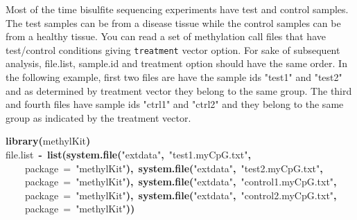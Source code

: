 \documentclass{article}
\makeatletter
\newcommand{\hlfunctioncall}[1]{\textcolor[rgb]{.5,0,.33}{\textbf{#1}}}%
\newcommand{\hlstring}[1]{\textcolor[rgb]{.6,.6,1}{#1}}%
\newcommand{\hlkeyword}[1]{\textbf{#1}}%
\newcommand{\hlargument}[1]{\textcolor[rgb]{.69,.25,.02}{#1}}%
\newcommand{\hlassignement}[1]{\textbf{#1}}%
\newcommand{\hlsymbol}[1]{#1}%
\newcommand{\hlstd}[1]{\textcolor[rgb]{0,0,0}{#1}}%
\newenvironment{kframe}{%
 \def\FrameCommand##1{\hskip\@totalleftmargin \hskip-\fboxsep
 \colorbox{shadecolor}{##1}\hskip-\fboxsep
     \hskip-\linewidth \hskip-\@totalleftmargin \hskip\columnwidth}%
 \MakeFramed {\advance\hsize-\width
   \@totalleftmargin\z@ \linewidth\hsize
   \@setminipage}}%
 {\par\unskip\endMakeFramed}
\newenvironment{knitrout}{}{} %
\makeatother
\begin{document}
Most of the time bisulfite sequencing experiments have test and control samples. The test samples can be from a disease tissue while the control samples can be from a healthy tissue. You can read a set of methylation call files that have test/control conditions giving \texttt{treatment} vector option. For sake of subsequent analysis, file.list, sample.id and treatment option should have the same order. In the following example, first two files are have the sample ids "test1" and "test2" and as determined by treatment vector they belong to the same group. The third and fourth files have sample ids "ctrl1" and "ctrl2" and they belong to the same group as indicated by the treatment vector.

\begin{knitrout}
\color{fgcolor}\begin{kframe}
\begin{flushleft}
\ttfamily\noindent
\hlfunctioncall{library}\hlkeyword{(}\hlsymbol{methylKit}\hlkeyword{)}\hspace*{\fill}\\
\hlstd{}\hlsymbol{file.list}{\ }\hlassignement{\usebox{\hlnormalsizeboxlessthan}-}{\ }\hlfunctioncall{list}\hlkeyword{(}\hlfunctioncall{system.file}\hlkeyword{(}\hlstring{"{}extdata"{}}\hlkeyword{,}{\ }\hlstring{"{}test1.myCpG.txt"{}}\hlkeyword{,}\hspace*{\fill}\\
\hlstd{}{\ }{\ }{\ }{\ }\hlargument{package}{\ }\hlargument{=}{\ }\hlstring{"{}methylKit"{}}\hlkeyword{)}\hlkeyword{,}{\ }\hlfunctioncall{system.file}\hlkeyword{(}\hlstring{"{}extdata"{}}\hlkeyword{,}{\ }\hlstring{"{}test2.myCpG.txt"{}}\hlkeyword{,}\hspace*{\fill}\\
\hlstd{}{\ }{\ }{\ }{\ }\hlargument{package}{\ }\hlargument{=}{\ }\hlstring{"{}methylKit"{}}\hlkeyword{)}\hlkeyword{,}{\ }\hlfunctioncall{system.file}\hlkeyword{(}\hlstring{"{}extdata"{}}\hlkeyword{,}{\ }\hlstring{"{}control1.myCpG.txt"{}}\hlkeyword{,}\hspace*{\fill}\\
\hlstd{}{\ }{\ }{\ }{\ }\hlargument{package}{\ }\hlargument{=}{\ }\hlstring{"{}methylKit"{}}\hlkeyword{)}\hlkeyword{,}{\ }\hlfunctioncall{system.file}\hlkeyword{(}\hlstring{"{}extdata"{}}\hlkeyword{,}{\ }\hlstring{"{}control2.myCpG.txt"{}}\hlkeyword{,}\hspace*{\fill}\\
\hlstd{}{\ }{\ }{\ }{\ }\hlargument{package}{\ }\hlargument{=}{\ }\hlstring{"{}methylKit"{}}\hlkeyword{)}\hlkeyword{)}\hspace*{\fill}\\

\end{flushleft}
\end{kframe}
\end{knitrout}
\end{document}
